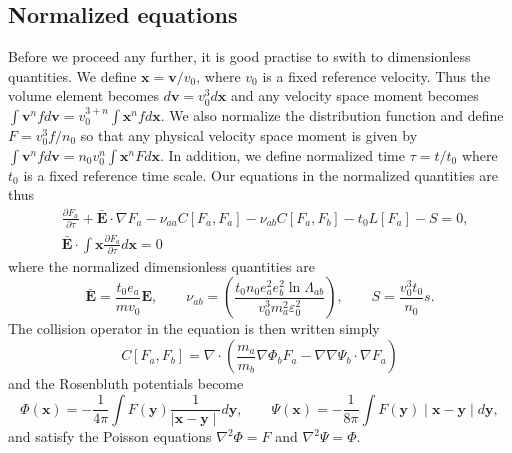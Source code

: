 \documentclass[preprint]{revtex4}
\begin{document}
\subsection{Normalized equations}
Before we proceed any further, it is good practise to swith to dimensionless quantities. We define $\bm{x}=\bm{v}/v_0$, where $v_0$ is a fixed reference velocity. Thus the volume element becomes $d\bm{v}=v_0^3d\bm{x}$ and any velocity space moment becomes $\int \bm{v}^n fd\bm{v}=v_0^{3+n}\int \bm{x}^nf d\bm{x}$. We also normalize the distribution function and define $F=v_0^3f/n_0$ so that any physical velocity space moment is given by $\int \bm{v}^n fd\bm{v}=n_0v_0^{n}\int \bm{x}^nF d\bm{x}$. In addition, we define normalized time $\tau=t/t_0$ where $t_0$ is a fixed reference time scale. Our equations in the normalized quantities are thus
\begin{align}
&\frac{\partial F_a}{\partial\tau}+\bar{\bm{E}}\cdot\nabla F_a-\nu_{aa} C[F_a,F_a]-\nu_{ab} C[F_a,F_b]-t_0L[F_a]-S=0,\\
&\bar{\bm{E}}\cdot\int\bm{x}\frac{\partial F_a}{\partial\tau}d\bm{x}=0
\end{align}
where the normalized dimensionless quantities are
\begin{equation}
\bar{\bm{E}}=\frac{t_0e_a}{mv_0}\bm{E},\qquad \nu_{ab}=\left(\frac{t_0n_0e_a^2e_b^2\ln\Lambda_{ab}}{v_0^3m_a^2\varepsilon_0^2}\right),\qquad S=\frac{v_0^3t_0}{n_0}s.
\end{equation}
The collision operator in the equation is then written simply
\begin{equation}
C[F_a,F_b]=\nabla\cdot\left(\frac{m_a}{m_b}\nabla\Phi_b F_a-\nabla\nabla\Psi_b\cdot\nabla F_a\right)
\end{equation}
and the Rosenbluth potentials become
\begin{equation}
\Phi(\bm{x})=-\frac{1}{4\pi}\int F(\bm{y})\frac{1}{\mid \bm{x}-\bm{y}\mid}d\bm{y},\qquad \Psi(\bm{x})=-\frac{1}{8\pi}\int F(\bm{y})\mid \bm{x}-\bm{y}\mid d\bm{y},
\end{equation}
and satisfy the Poisson equations $\nabla^2\Phi = F$ and $\nabla^2\Psi =\Phi$.
\end{document}
